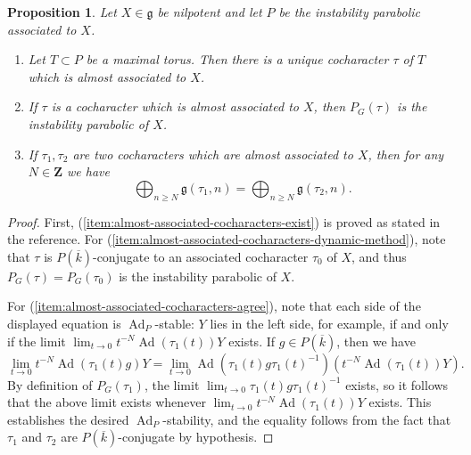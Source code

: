 \documentclass[11pt,reqno]{amsart}
\newtheorem{prop}[theorem]{Proposition}
\theoremstyle{definition}
\newcommand{\bZ}{{\mathbf Z}}
\newcommand{\fg}{\mathfrak{g}}
\DeclareMathOperator{\Ad}{Ad}
\begin{document}
\begin{prop}\label{proposition:mcninch-almost-associated-cocharacters}
Let $X \in \fg$ be nilpotent and let $P$ be the instability parabolic associated to $X$.
\begin{enumerate}
    \item\label{item:almost-associated-cocharacters-exist}\cite[4.3.1]{McNinch-relative-centralizer} Let $T \subset P$ be a maximal torus. Then there is a unique cocharacter $\tau$ of $T$ which is almost associated to $X$.
    \item\label{item:almost-associated-cocharacters-dynamic-method} If $\tau$ is a cocharacter which is almost associated to $X$, then $P_G(\tau)$ is the instability parabolic of $X$.
    \item\label{item:almost-associated-cocharacters-agree}\cite[4.3.2]{McNinch-relative-centralizer} If $\tau_1, \tau_2$ are two cocharacters which are almost associated to $X$, then for any $N \in \bZ$ we have
    \[
    \bigoplus_{n \geq N} \fg(\tau_1, n) = \bigoplus_{n \geq N} \fg(\tau_2, n).
    \]
\end{enumerate}
\end{prop}

\begin{proof}
First, (\ref{item:almost-associated-cocharacters-exist}) is proved as stated in the reference. For (\ref{item:almost-associated-cocharacters-dynamic-method}), note that $\tau$ is $P(\overline{k})$-conjugate to an associated cocharacter $\tau_0$ of $X$, and thus $P_G(\tau) = P_G(\tau_0)$ is the instability parabolic of $X$. \smallskip

For (\ref{item:almost-associated-cocharacters-agree}), note that each side of the displayed equation is $\Ad_P$-stable: $Y$ lies in the left side, for example, if and only if the limit $\lim_{t \to 0} t^{-N} \Ad(\tau_1(t))Y$ exists. If $g \in P(\overline{k})$, then we have
\[
\lim_{t \to 0} t^{-N} \Ad(\tau_1(t)g)Y = \lim_{t \to 0} \Ad(\tau_1(t)g\tau_1(t)^{-1}) (t^{-N}\Ad(\tau_1(t))Y).
\]
By definition of $P_G(\tau_1)$, the limit $\lim_{t \to 0} \tau_1(t)g\tau_1(t)^{-1}$ exists, so it follows that the above limit exists whenever $\lim_{t \to 0} t^{-N} \Ad(\tau_1(t))Y$ exists. This establishes the desired $\Ad_P$-stability, and the equality follows from the fact that $\tau_1$ and $\tau_2$ are $P(\overline{k})$-conjugate by hypothesis.
\end{proof}
\end{document}
